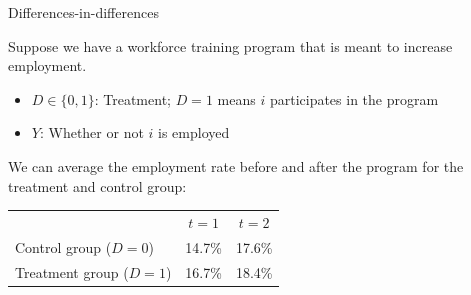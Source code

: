\begin{frame}{Differences-in-differences}

Suppose we have a workforce training program that is meant to increase employment. 
\begin{itemize}
    \item $D \in \{0, 1\}$: Treatment; $D=1$ means $i$ participates in the program
    \item $Y$: Whether or not $i$ is employed
\end{itemize}
We can average the employment rate before and after the program for the treatment and control group:
\begin{table}
\begin{tabular}{lcc}
& $t=1$ & $t=2$ \\
Control group ($D=0$) & 14.7\% & 17.6\% \\
Treatment group ($D=1$) & 16.7\% & 18.4\%
\end{tabular}
\end{table}

\end{frame}

